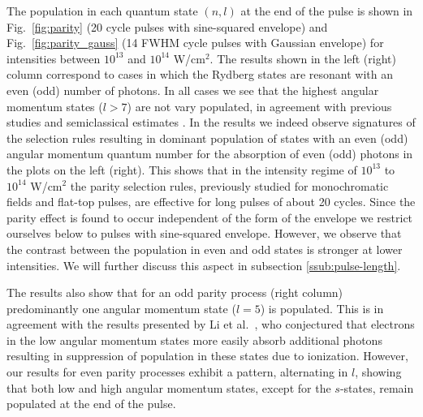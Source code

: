 The population in each quantum state $(n, l)$ at the end of the pulse is shown in Fig.~\ref{fig:parity} (20 cycle pulses with sine-squared envelope) and Fig.~\ref{fig:parity_gauss} (14 FWHM cycle pulses with Gaussian envelope) for intensities between $10^{13}$ and $10^{14}$ W/cm$^2$. The results shown in the left (right) column correspond to cases in which the Rydberg states are resonant with an even (odd) number of photons. In all cases we see that the highest angular momentum states ($l>7$) are not vary populated, in agreement with previous studies \cite{piraux2017} and semiclassical estimates \cite{arbo2008}. In the results we indeed observe signatures of the selection rules resulting in dominant population of states with an even (odd) angular momentum quantum number for the absorption of even (odd) photons in the plots on the left (right). This shows that in the intensity regime of $10^{13}$ to $10^{14}$ W/cm$^2$ the parity selection rules, previously studied for monochromatic fields and flat-top pulses, are effective for long pulses of about 20 cycles. Since the parity effect is found to occur independent of the form of the envelope we restrict ourselves below to pulses with sine-squared envelope. However, we observe that the contrast between the population in even and odd states is stronger at lower intensities. We will further discuss this aspect in subsection \ref{ssub:pulse-length}.  

The results also show that for an odd parity process (right column) predominantly one angular momentum state ($l=5$) is populated. This is in agreement with the results presented by Li et al.\ \cite{li2014b}, who conjectured that electrons in the low angular momentum states more easily absorb additional photons resulting in suppression of population in these states due to ionization. However, our results for even parity processes exhibit a pattern, alternating in $l$, showing that both low and high angular momentum states, except for the $s$-states, remain populated at the end of the pulse. 

